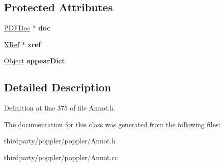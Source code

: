 \subsection*{Protected Attributes}
\begin{DoxyCompactItemize}
\item 
\mbox{\label{class_annot_appearance_a00984905055d8d8baf481def0dab4db5}} 
\hyperlink{class_p_d_f_doc}{P\+D\+F\+Doc} $\ast$ {\bfseries doc}
\item 
\mbox{\label{class_annot_appearance_a1fa1a9893754ae88508687503189051c}} 
\hyperlink{class_x_ref}{X\+Ref} $\ast$ {\bfseries xref}
\item 
\mbox{\label{class_annot_appearance_a2d9df248b925a7bf564f8c2590862b0a}} 
\hyperlink{class_object}{Object} {\bfseries appear\+Dict}
\end{DoxyCompactItemize}


\subsection{Detailed Description}


Definition at line 375 of file Annot.\+h.



The documentation for this class was generated from the following files\+:\begin{DoxyCompactItemize}
\item 
thirdparty/poppler/poppler/Annot.\+h\item 
thirdparty/poppler/poppler/Annot.\+cc\end{DoxyCompactItemize}
